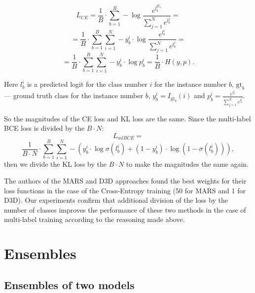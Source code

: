 \documentclass[conference]{IEEEtran}
\begin{document}
$$L_{CE}=\frac{1}{B}\cdot\sum_{b=1}^{B} -\log{\frac{e^{l_b^{\text{gt}_b}}}{\sum_{j=1}^{N}e^{l_b^j}}}=$$
\begin{equation}=\frac{1}{B}\cdot\sum_{b=1}^{B}\sum_{i=1}^{N}-y_b^i\cdot\log{\frac{e^{l_b^{i}}}{\sum_{j=1}^{N}e^{l_b^j}}}=\end{equation}
$$=\frac{1}{B}\cdot\sum_{b=1}^{B}\sum_{i=1}^{N}-y_b^i\cdot\log{p_b^i}=\frac{1}{B}\cdot H(y,p).$$

Here $l_b^i$ is a predicted logit for the class number $i$ for the instance number $b$, $\text{gt}_b$ --- ground truth class for the instance number $b$, $y_b^i=I_{\text{gt}_b}(i)$ and $p_b^i=\frac{e^{l_b^{i}}}{\sum_{j=1}^{N}e^{l_b^j}}$.

So the magnitudes of the CE loss and KL loss are the same. Since the multi-label BCE loss is divided by the $B\cdot N$:
\begin{equation}L_{mlBCE} =\end{equation}
$$\frac{1}{B\cdot N}\cdot\sum_{b=1}^{B}\sum_{i=1}^{N}-\left(y_b^i\cdot\log{\sigma(l_b^i)}+(1-y_b^i)\cdot\log{\left(1-\sigma(l_b^i)\right)}\right),$$
then we divide the KL loss by the $B\cdot N$ to make the magnitudes the same again.

The authors of the MARS and D3D approaches found the best weights for their loss functions in the case of the Cross-Entropy training (50 for MARS and 1 for D3D).  Our experiments confirm that additional division of the loss by the number of classes improves the performance of these two methods in the case of multi-label training according to the reasoning made above.

\section{Ensembles}

\subsection{Ensembles of two models} \label{app:b1}
\end{document}
